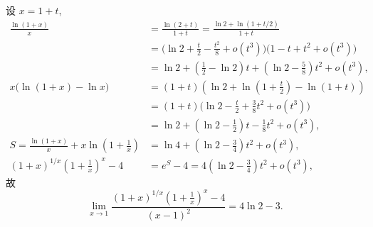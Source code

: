 \documentclass{amsart}
\begin{document}
设 $x=1+t$,
\begin{align*}
	\frac{\ln(1+x)}{x}&
	=\frac{\ln(2+t)}{1+t}
	=\frac{\ln 2+\ln(1+t/2)}{1+t}\\
	&=\bigl(\ln 2+\frac t2-\frac{t^2}8+o(t^3)\bigr)\bigl(1-t+t^2+o(t^3)\bigr)\\
	&=\ln2+(\frac12-\ln 2)t+(\ln 2-\frac 58)t^2+o(t^3),\\
	x\bigl(\ln(1+x)-\ln x\bigr)&
	=(1+t)(\ln 2+\ln(1+\frac t2)-\ln(1+t))\\
	&=(1+t)\bigl(\ln 2-\frac t2+\frac 38 t^2+o(t^3)\bigr)\\
	&=\ln 2+(\ln 2-\frac 12)t-\frac 18t^2+o(t^3),\\
	S=\frac{\ln(1+x)}{x}+x\ln(1+\frac 1x)
	&=\ln 4+(\ln 2-\frac 34)t^2+o(t^3),\\
	(1+x)^{1/x}(1+\frac1x)^x-4
	&=e^S-4
	=4(\ln 2-\frac 34)t^2+o(t^3),
\end{align*}
故
\[\lim_{x\to 1}\frac{(1+x)^{1/x}(1+\frac1x)^x-4}{(x-1)^2}=4\ln 2-3.\]
\end{document}
